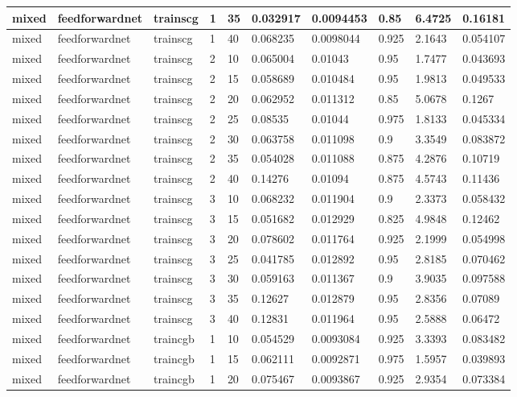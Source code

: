 \begin{longtable}{lllllllll}
mixed & feedforwardnet & trainscg & 1 & 35 & 0.032917 & 0.0094453 & 0.85 & 6.4725 & 0.16181 \\ \hline 
mixed & feedforwardnet & trainscg & 1 & 40 & 0.068235 & 0.0098044 & 0.925 & 2.1643 & 0.054107 \\ \hline 
mixed & feedforwardnet & trainscg & 2 & 10 & 0.065004 & 0.01043 & 0.95 & 1.7477 & 0.043693 \\ \hline 
mixed & feedforwardnet & trainscg & 2 & 15 & 0.058689 & 0.010484 & 0.95 & 1.9813 & 0.049533 \\ \hline 
mixed & feedforwardnet & trainscg & 2 & 20 & 0.062952 & 0.011312 & 0.85 & 5.0678 & 0.1267 \\ \hline 
mixed & feedforwardnet & trainscg & 2 & 25 & 0.08535 & 0.01044 & 0.975 & 1.8133 & 0.045334 \\ \hline 
mixed & feedforwardnet & trainscg & 2 & 30 & 0.063758 & 0.011098 & 0.9 & 3.3549 & 0.083872 \\ \hline 
mixed & feedforwardnet & trainscg & 2 & 35 & 0.054028 & 0.011088 & 0.875 & 4.2876 & 0.10719 \\ \hline 
mixed & feedforwardnet & trainscg & 2 & 40 & 0.14276 & 0.01094 & 0.875 & 4.5743 & 0.11436 \\ \hline 
mixed & feedforwardnet & trainscg & 3 & 10 & 0.068232 & 0.011904 & 0.9 & 2.3373 & 0.058432 \\ \hline 
mixed & feedforwardnet & trainscg & 3 & 15 & 0.051682 & 0.012929 & 0.825 & 4.9848 & 0.12462 \\ \hline 
mixed & feedforwardnet & trainscg & 3 & 20 & 0.078602 & 0.011764 & 0.925 & 2.1999 & 0.054998 \\ \hline 
mixed & feedforwardnet & trainscg & 3 & 25 & 0.041785 & 0.012892 & 0.95 & 2.8185 & 0.070462 \\ \hline 
mixed & feedforwardnet & trainscg & 3 & 30 & 0.059163 & 0.011367 & 0.9 & 3.9035 & 0.097588 \\ \hline 
mixed & feedforwardnet & trainscg & 3 & 35 & 0.12627 & 0.012879 & 0.95 & 2.8356 & 0.07089 \\ \hline 
mixed & feedforwardnet & trainscg & 3 & 40 & 0.12831 & 0.011964 & 0.95 & 2.5888 & 0.06472 \\ \hline 
mixed & feedforwardnet & traincgb & 1 & 10 & 0.054529 & 0.0093084 & 0.925 & 3.3393 & 0.083482 \\ \hline 
mixed & feedforwardnet & traincgb & 1 & 15 & 0.062111 & 0.0092871 & 0.975 & 1.5957 & 0.039893 \\ \hline 
mixed & feedforwardnet & traincgb & 1 & 20 & 0.075467 & 0.0093867 & 0.925 & 2.9354 & 0.073384 \\ \hline 

\end{longtable}
